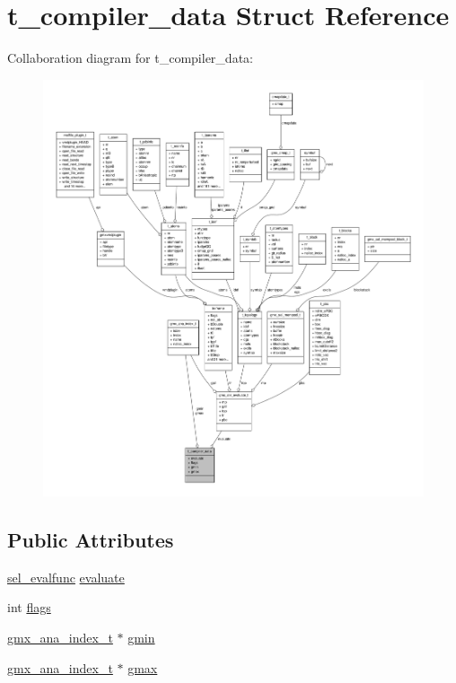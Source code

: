 \hypertarget{structt__compiler__data}{\section{t\-\_\-compiler\-\_\-data \-Struct \-Reference}
\label{structt__compiler__data}
}


\-Collaboration diagram for t\-\_\-compiler\-\_\-data\-:
\nopagebreak
\begin{figure}[H]
\begin{center}
\leavevmode
\includegraphics[width=350pt]{structt__compiler__data__coll__graph}
\end{center}
\end{figure}
\subsection*{\-Public \-Attributes}
\begin{DoxyCompactItemize}
\item 
\hyperlink{selelem_8h_a69c287b69b10372680bbecd6e49a1d9f}{sel\-\_\-evalfunc} \hyperlink{structt__compiler__data_a131ed5a33c6fb7c00aeca41b2683319a}{evaluate}
\item 
int \hyperlink{structt__compiler__data_aca709f984aa145cd081a0da4a5c47ecc}{flags}
\item 
\hyperlink{structgmx__ana__index__t}{gmx\-\_\-ana\-\_\-index\-\_\-t} $\ast$ \hyperlink{structt__compiler__data_aa7582887488092293b01419c70a198da}{gmin}
\item 
\hyperlink{structgmx__ana__index__t}{gmx\-\_\-ana\-\_\-index\-\_\-t} $\ast$ \hyperlink{structt__compiler__data_aec0dc8d1c9fd5d16402bd4f82544f8ab}{gmax}
\end{DoxyCompactItemize}


